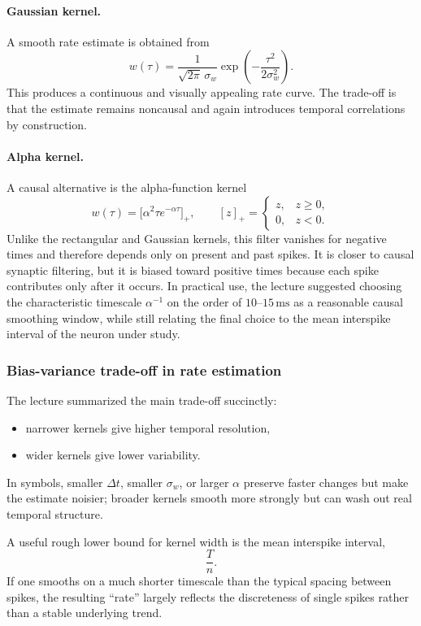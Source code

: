 \documentclass[11pt]{article}
\begin{document}
\paragraph{Gaussian kernel.}
A smooth rate estimate is obtained from
\[
w(\tau)=\frac{1}{\sqrt{2\pi}\,\sigma_w}
\exp\!\left(-\frac{\tau^2}{2\sigma_w^2}\right).
\]
This produces a continuous and visually appealing rate curve. The trade-off is that the estimate remains noncausal and again introduces temporal correlations by construction.

\paragraph{Alpha kernel.}
A causal alternative is the alpha-function kernel
\[
w(\tau)=\bigl[\alpha^2 \tau e^{-\alpha \tau}\bigr]_+,
\qquad
[z]_+ =
\begin{cases}
z, & z\ge 0,\\
0, & z<0.
\end{cases}
\]
Unlike the rectangular and Gaussian kernels, this filter vanishes for negative times and therefore depends only on present and past spikes. It is closer to causal synaptic filtering, but it is biased toward positive times because each spike contributes only after it occurs. In practical use, the lecture suggested choosing the characteristic timescale $\alpha^{-1}$ on the order of $10$--$15\,\mathrm{ms}$ as a reasonable causal smoothing window, while still relating the final choice to the mean interspike interval of the neuron under study.

\subsubsection{Bias-variance trade-off in rate estimation}

The lecture summarized the main trade-off succinctly:
\begin{itemize}
    \item narrower kernels give higher temporal resolution,
    \item wider kernels give lower variability.
\end{itemize}
In symbols, smaller $\Delta t$, smaller $\sigma_w$, or larger $\alpha$ preserve faster changes but make the estimate noisier; broader kernels smooth more strongly but can wash out real temporal structure.

A useful rough lower bound for kernel width is the mean interspike interval,
\[
\frac{T}{n}.
\]
If one smooths on a much shorter timescale than the typical spacing between spikes, the resulting ``rate'' largely reflects the discreteness of single spikes rather than a stable underlying trend.
\end{document}
